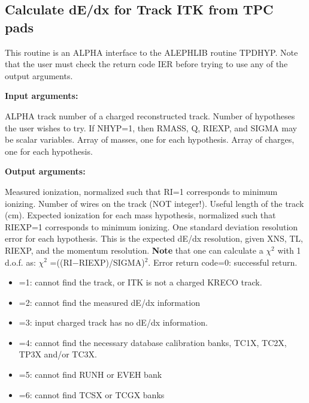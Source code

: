 \par
\subsection{\label{sec-ARDEDXP}Calculate dE/dx for Track ITK from TPC pads}
\par
{}
\par
This routine is an ALPHA interface to the ALEPHLIB routine TPDHYP.
Note that the user must check the return code IER before trying
to use any of the output arguments.
\par
{\bf Input arguments:}
\begin{indentlist}{ 3.50cm}{ 3.75cm}
ALPHA track number of a charged reconstructed track.
Number of hypotheses the user wishes to try.
If NHYP=1, then RMASS, Q, RIEXP, and SIGMA may be scalar variables.
Array of masses, one for each hypothesis.
Array of charges, one for each hypothesis.
\end{indentlist}
\par
{\bf Output arguments:}
\begin{indentlist}{ 3.50cm}{ 3.75cm}
Measured ionization, normalized
such that
RI=1 corresponds to minimum ionizing.
Number of wires on the track (NOT integer!).
Useful length of the track (cm).
Expected ionization for each mass hypothesis,
normalized such that RIEXP=1 corresponds to minimum ionizing.
One standard deviation resolution error for
each
hypothesis.  This is the expected dE/dx
resolution, given XNS, TL, RIEXP, and
the momentum resolution.
{\bf Note} that one can calculate a $\chi^2$ with 1 d.o.f. as:
$\chi^2$ =((RI$-$RIEXP)/SIGMA)$^2$.
Error return code=0: successful return.
\begin{itemize}
\item =1:  cannot find the track, or ITK is not a charged KRECO track.
\item =2:  cannot find the measured dE/dx information
\item =3:  input charged track has no dE/dx information.
\item =4:  cannot find the necessary database calibration banks,
TC1X, TC2X, TP3X and/or TC3X.
\item =5:  cannot find RUNH or EVEH bank
\item =6:  cannot find TCSX or TCGX banks
\end{itemize}
\end{indentlist}

